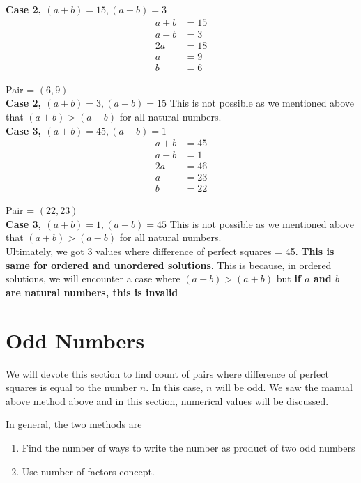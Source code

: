 \textbf{Case 2, $(a+b) = 15, (a-b) = 3$}
\begin{align*}
    a+b &= 15 \\
    a-b &= 3 \\
    2a &= 18 \tag{add above equations} \\
    a &= 9 \\
    b &= 6 \tag{Use $a+b = 15$}
\end{align*}

Pair = $(6,9)$ \\

\textbf{Case 2, $(a+b) = 3, (a-b) = 15$}
This is not possible as we mentioned above that $(a + b) > (a - b)$ for all natural numbers. \\

\textbf{Case 3, $(a+b) = 45, (a-b) = 1$}
\begin{align*}
    a+b &= 45 \\
    a-b &= 1 \\
    2a &= 46 \tag{add above equations} \\
    a &= 23 \\
    b &= 22 \tag{Use $a+b = 23$}
\end{align*}

Pair = $(22,23)$ \\

\textbf{Case 3, $(a+b) = 1, (a-b) = 45$}
This is not possible as we mentioned above that $(a + b) > (a - b)$ for all natural numbers. \\

Ultimately, we got 3 values where difference of perfect squares = 45. \textbf{This is same for ordered and unordered solutions}. This is because, in ordered solutions, we will encounter a case where $(a-b) > (a+b)$ but \textbf{if $a$ and $b$ are natural numbers, this is invalid}

\section{Odd Numbers}

We will devote this section to find count of pairs where difference of perfect squares is equal to the number $n$. In this case, $n$ will be odd. We saw the manual above method above and in this section, numerical values will be discussed. 

In general, the two methods are 
\begin{enumerate}
    \item Find the number of ways to write the number as product of two odd numbers
    \item Use number of factors concept.
\end{enumerate}

